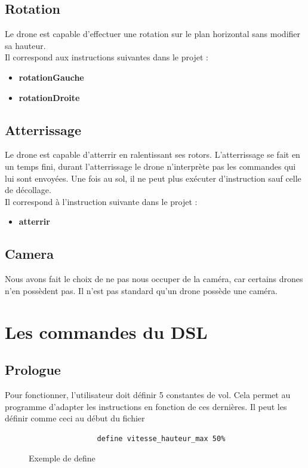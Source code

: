 \documentclass[12pt, openany]{report}
\begin{document}
\section{Rotation}
Le drone est capable d'effectuer une rotation sur le plan horizontal sans modifier sa hauteur.\\
Il correspond aux instructions suivantes dans le projet :
  \begin{itemize}
      \item \textbf{rotationGauche}
      \item \textbf{rotationDroite}
\end{itemize} 
        
 
\section{Atterrissage}
Le drone est capable d'atterrir en ralentissant ses rotors. L'atterrissage se fait en un temps fini, durant l'atterrissage le drone n'interprète pas les commandes qui lui sont envoyées. Une fois au sol, il ne peut plus exécuter d'instruction sauf celle de décollage. \\
Il correspond à l'instruction suivante dans le projet :
\begin{itemize}
      \item \textbf{atterrir}
\end{itemize}
 
\section{Camera}
Nous avons fait le choix de ne pas nous occuper de la caméra, car certains drones n'en possèdent pas. Il n'est pas standard qu'un drone possède une caméra.

\chapter{Les commandes du DSL}

\section{Prologue}
Pour fonctionner, l'utilisateur doit définir 5 constantes de vol.
Cela permet au programme d'adapter les instructions en fonction de ces dernières.
Il peut les définir comme ceci au début du fichier \newline

\begin{figure}[h!]
        \begin{center}
            \begin{Verbatim}
                define vitesse_hauteur_max 50%
            \end{Verbatim}
        \end{center}
        \caption{Exemple de define}
        \label{Exemple de define}
    \end{figure}
\end{document}
